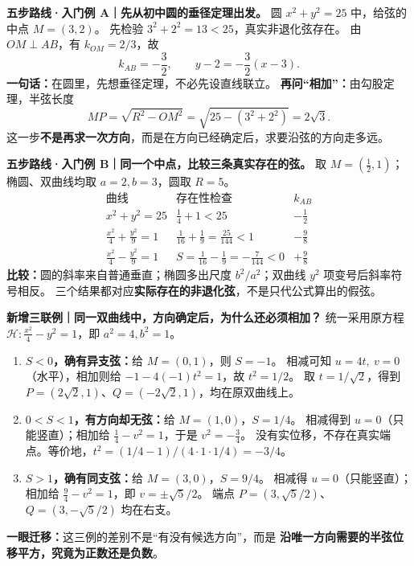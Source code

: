 
\clearpage
\begin{examplebox}
\textbf{五步路线·入门例 A｜先从初中圆的垂径定理出发。}
圆 $x^2+y^2=25$ 中，给弦的中点 $M=(3,2)$。
先检验 $3^2+2^2=13<25$，真实非退化弦存在。
由 $OM\perp AB$，有 $k_{OM}=2/3$，故
\[
\boxed{k_{AB}=-\frac32},\qquad
\boxed{y-2=-\frac32(x-3)}.
\]
\textbf{一句话：}在圆里，先想垂径定理，不必先设直线联立。
\textbf{再问``相加''：}由勾股定理，半弦长度
\[
MP=\sqrt{R^2-OM^2}=\sqrt{25-(3^2+2^2)}=2\sqrt3.
\]
这一步\textbf{不是再求一次方向}，而是在方向已经确定后，求要沿弦的方向走多远。
\par\medskip\noindent
\textbf{五步路线·入门例 B｜同一个中点，比较三条\textbf{真实存在}的弦。}
取 $M=(\frac12,1)$；椭圆、双曲线均取 $a=2,b=3$，圆取 $R=5$。
\[
\begin{array}{c|c|c}
\text{曲线}&\text{存在性检查}&k_{AB}\\\hline
x^2+y^2=25 &\frac14+1<25&-\frac12\\[3pt]
\frac{x^2}{4}+\frac{y^2}{9}=1 &\frac1{16}+\frac19=\frac{25}{144}<1&-\frac98\\[4pt]
\frac{x^2}{4}-\frac{y^2}{9}=1 & S=\frac1{16}-\frac19=-\frac7{144}<0&+\frac98
\end{array}
\]
\textbf{比较：}圆的斜率来自普通垂直；椭圆多出尺度 $b^2/a^2$；双曲线 $y^2$ 项变号后斜率符号相反。
三个结果都对应\textbf{实际存在的非退化弦}，不是只代公式算出的假弦。
\end{examplebox}
\clearpage
\begin{examplebox}
\textbf{新增三联例｜同一双曲线中，方向确定后，为什么还必须相加？}
统一采用原方程 $\mathcal H:\frac{x^2}{4}-y^2=1$，即 $a^2=4,b^2=1$。
\begin{enumerate}[leftmargin=2em,topsep=2pt,itemsep=3pt]
\item \textbf{$S<0$，确有异支弦：}给 $M=(0,1)$，则 $S=-1$。
相减可知 $u=4t,\ v=0$（水平），相加则给
$-1-4(-1)t^2=1$，故 $t^2=1/2$。
取 $t=1/\sqrt2$，得到
$P=(2\sqrt2,1)$、$Q=(-2\sqrt2,1)$，均在原双曲线上。
\item \textbf{$0<S<1$，有方向却无弦：}给 $M=(1,0)$，$S=1/4$。
相减得到 $u=0$（只能竖直）；相加给
$\frac14-v^2=1$，于是 $v^2=-\frac34$。
没有实位移，不存在真实端点。等价地，$t^2=(1/4-1)/(4\cdot1\cdot1/4)=-3/4$。
\item \textbf{$S>1$，确有同支弦：}给 $M=(3,0)$，$S=9/4$。
相减得 $u=0$（只能竖直）；相加给
$\frac94-v^2=1$，即 $v=\pm\sqrt5/2$。
端点 $P=(3,\sqrt5/2)$、$Q=(3,-\sqrt5/2)$ 均在右支。
\end{enumerate}
\textbf{一眼迁移：}这三例的差别不是``有没有候选方向''，而是
\textbf{沿唯一方向需要的半弦位移平方，究竟为正数还是负数}。
\end{examplebox}
